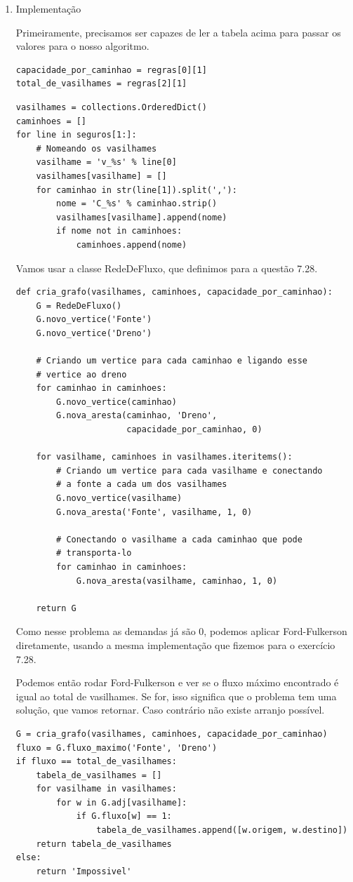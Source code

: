 \documentclass[11pt]{article}
\begin{document}
\begin{enumerate}
\item Implementação
\label{sec-6-2-1-1}

Primeiramente, precisamos ser capazes de ler a tabela acima para
passar os valores para o nosso algoritmo.
\begin{verbatim}
capacidade_por_caminhao = regras[0][1]
total_de_vasilhames = regras[2][1]
\end{verbatim}

\begin{verbatim}
vasilhames = collections.OrderedDict()
caminhoes = []
for line in seguros[1:]:
    # Nomeando os vasilhames
    vasilhame = 'v_%s' % line[0]
    vasilhames[vasilhame] = []
    for caminhao in str(line[1]).split(','):
        nome = 'C_%s' % caminhao.strip()
        vasilhames[vasilhame].append(nome)
        if nome not in caminhoes:
            caminhoes.append(nome)
\end{verbatim}

Vamos usar a classe RedeDeFluxo, que definimos para a questão 7.28.

\begin{verbatim}
def cria_grafo(vasilhames, caminhoes, capacidade_por_caminhao):
    G = RedeDeFluxo()
    G.novo_vertice('Fonte')
    G.novo_vertice('Dreno')

    # Criando um vertice para cada caminhao e ligando esse
    # vertice ao dreno
    for caminhao in caminhoes:
        G.novo_vertice(caminhao)
        G.nova_aresta(caminhao, 'Dreno',
                      capacidade_por_caminhao, 0)

    for vasilhame, caminhoes in vasilhames.iteritems():
        # Criando um vertice para cada vasilhame e conectando
        # a fonte a cada um dos vasilhames
        G.novo_vertice(vasilhame)
        G.nova_aresta('Fonte', vasilhame, 1, 0)

        # Conectando o vasilhame a cada caminhao que pode
        # transporta-lo
        for caminhao in caminhoes:
            G.nova_aresta(vasilhame, caminhao, 1, 0)

    return G
\end{verbatim}

Como nesse problema as demandas já são 0, podemos aplicar
Ford-Fulkerson diretamente, usando a mesma implementação que fizemos
para o exercício 7.28.

Podemos então rodar Ford-Fulkerson e ver se o fluxo máximo encontrado
é igual ao total de vasilhames. Se for, isso significa que o problema
tem uma solução, que vamos retornar. Caso contrário não existe arranjo
possível.
\begin{verbatim}
G = cria_grafo(vasilhames, caminhoes, capacidade_por_caminhao)
fluxo = G.fluxo_maximo('Fonte', 'Dreno')
if fluxo == total_de_vasilhames:
    tabela_de_vasilhames = []
    for vasilhame in vasilhames:
        for w in G.adj[vasilhame]:
            if G.fluxo[w] == 1:
                tabela_de_vasilhames.append([w.origem, w.destino])
    return tabela_de_vasilhames
else:
    return 'Impossivel'
\end{verbatim}


\end{enumerate}
\end{document}

